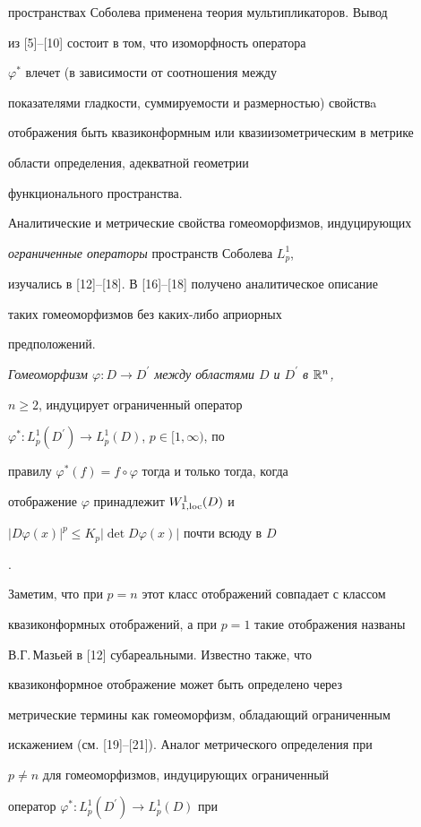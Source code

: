 пространствах Соболева применена теория мультипликаторов. Вывод


из [5]--[10] состоит в том, что изоморфность оператора


$\varphi^*$ влечет (в зависимости от соотношения между


показателями гладкости, суммируемости и размерностью) свойствa


отображения быть квазиконформным или квазиизометрическим в метрике


области определения, адекватной геометрии


функционального пространства.





Аналитические и метрические свойства гомеоморфизмов, индуцирующих


{\it ограниченные операторы} пространств Соболева $L^1_p$,


изучались в [12]--[18]. В [16]--[18] получено аналитическое описание


таких гомеоморфизмов без каких-либо априорных


предположений. {\it Гомеоморфизм $\varphi:D \to


D^{\prime}$ между областями $D$ и $D^{\prime}$ в ${\Bbb R}^n$,


$n\geq2$, индуцирует ограниченный оператор


$\varphi^*:L^1_p(D^{\prime})\to L^1_p(D)$, $p\in[1,\infty)$, по


правилу $\varphi^*(f)=f\circ\varphi$ тогда и только тогда, когда


отображение $\varphi$ принадлежит $W^1_{1,\operatorname{loc}}(D)$ и


$|D\varphi(x)|^p\leq K_p|\det D\varphi(x)|$ почти всюду в $D$}.


Заметим, что при $p=n$ этот класс отображений совпадает с классом


квазиконформных отображений, а при $p=1$ такие отображения названы


В.Г.\,Мазьей в [12] субареальными. Известно также, что


квазиконформное отображение может быть определено через


метрические термины как гомеоморфизм, обладающий ограниченным


искажением (см. [19]--[21]). Аналог метрического определения при


$p\neq n$ для гомеоморфизмов, индуцирующих ограниченный


оператор $\varphi^*:L^1_p(D^{\prime})\to L^1_p(D)$ при


